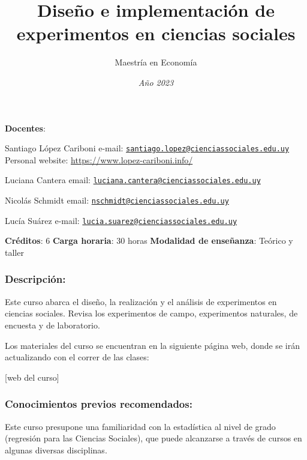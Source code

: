 \documentclass[
  12pt,
]{article}
\title{Diseño e implementación de experimentos en ciencias sociales}
\author{Maestría en Economía}
\date{\emph{Año 2023}}
\begin{document}
\maketitle

\textbf{Docentes}:

Santiago López Cariboni \newline e-mail:
\href{mailto:santiago.lopez@cienciassociales.edu.uy}{\nolinkurl{santiago.lopez@cienciassociales.edu.uy}}
\newline Personal website: \url{https://www.lopez-cariboni.info/}

Luciana Cantera \newline email:
\href{mailto:luciana.cantera@cienciassociales.edu.uy}{\nolinkurl{luciana.cantera@cienciassociales.edu.uy}}

Nicolás Schmidt \newline email:
\href{mailto:nschmidt@cienciassociales.edu.uy}{\nolinkurl{nschmidt@cienciassociales.edu.uy}}

Lucía Suárez \newline e-mail:
\href{mailto:lucia.suarez@cienciassociales.edu.uy}{\nolinkurl{lucia.suarez@cienciassociales.edu.uy}}

\textbf{Créditos}: 6 \newline \textbf{Carga horaria}: 30 horas \newline
\textbf{Modalidad de enseñanza}: Teórico y taller

\hypertarget{descripciuxf3n}{%
\subsubsection{Descripción:}\label{descripciuxf3n}}

Este curso abarca el diseño, la realización y el análisis de
experimentos en ciencias sociales. Revisa los experimentos de campo,
experimentos naturales, de encuesta y de laboratorio.

Los materiales del curso se encuentran en la siguiente página web, donde
se irán actualizando con el correr de las clases:

{[}web del curso{]}

\hypertarget{conocimientos-previos-recomendados}{%
\subsubsection{Conocimientos previos
recomendados:}\label{conocimientos-previos-recomendados}}

Este curso presupone una familiaridad con la estadística al nivel de
grado (regresión para las Ciencias Sociales), que puede alcanzarse a
través de cursos en algunas diversas disciplinas.
\end{document}

